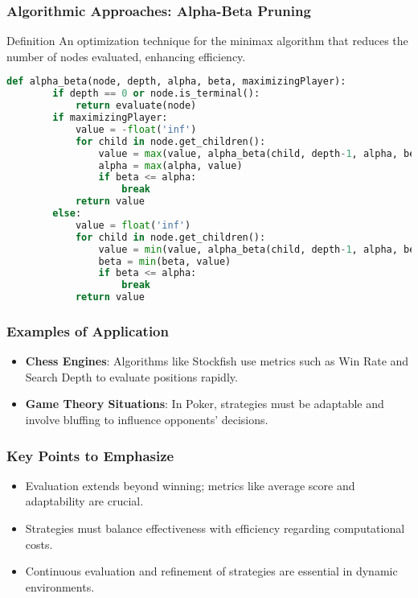 \documentclass[aspectratio=169]{beamer}
\begin{document}
\begin{frame}[fragile]
    \frametitle{Algorithmic Approaches: Alpha-Beta Pruning}
    \begin{block}{Definition}
        An optimization technique for the minimax algorithm that reduces the number of nodes evaluated, enhancing efficiency.
    \end{block}
    \begin{lstlisting}[language=Python]
    def alpha_beta(node, depth, alpha, beta, maximizingPlayer):
        if depth == 0 or node.is_terminal():
            return evaluate(node)
        if maximizingPlayer:
            value = -float('inf')
            for child in node.get_children():
                value = max(value, alpha_beta(child, depth-1, alpha, beta, False))
                alpha = max(alpha, value)
                if beta <= alpha:
                    break
            return value
        else:
            value = float('inf')
            for child in node.get_children():
                value = min(value, alpha_beta(child, depth-1, alpha, beta, True))
                beta = min(beta, value)
                if beta <= alpha:
                    break
            return value
    \end{lstlisting}
\end{frame}

\begin{frame}
    \frametitle{Examples of Application}
    \begin{itemize}
        \item \textbf{Chess Engines}: Algorithms like Stockfish use metrics such as Win Rate and Search Depth to evaluate positions rapidly.
        \item \textbf{Game Theory Situations}: In Poker, strategies must be adaptable and involve bluffing to influence opponents' decisions.
    \end{itemize}
\end{frame}

\begin{frame}
    \frametitle{Key Points to Emphasize}
    \begin{itemize}
        \item Evaluation extends beyond winning; metrics like average score and adaptability are crucial.
        \item Strategies must balance effectiveness with efficiency regarding computational costs.
        \item Continuous evaluation and refinement of strategies are essential in dynamic environments.
    \end{itemize}
\end{frame}
\end{document}
